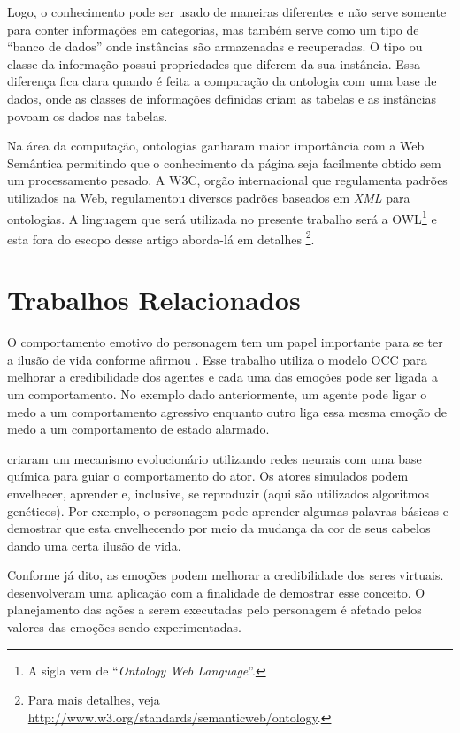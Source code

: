 Logo, o conhecimento pode ser usado de maneiras diferentes e não serve somente
para conter informações em categorias, mas também serve como um tipo de
``banco de dados'' onde instâncias são armazenadas e recuperadas.  O tipo ou
classe da informação possui propriedades que diferem da sua instância. Essa
diferença fica clara quando é feita a comparação da ontologia com uma base de
dados, onde as classes de informações definidas criam as tabelas e as
instâncias povoam os dados nas tabelas.

Na área da computação, ontologias ganharam maior importância com a Web
Semântica permitindo que o conhecimento da página seja facilmente obtido sem
um processamento pesado.  A W3C, orgão internacional que regulamenta padrões
utilizados na Web, regulamentou diversos padrões baseados em \emph{XML} para
ontologias.  A linguagem que será utilizada no presente trabalho será a
OWL\footnote{A sigla vem de ``\emph{Ontology Web Language}''.} e esta fora do
escopo desse artigo aborda-lá em detalhes \footnote{Para mais detalhes, veja
\url{http://www.w3.org/standards/semanticweb/ontology}.}.

\section{Trabalhos Relacionados}

O comportamento emotivo do personagem tem um papel importante para se ter a
ilusão de vida conforme afirmou \citet{bates1994role}. Esse trabalho utiliza o
modelo OCC para melhorar a credibilidade dos agentes e cada uma das emoções
pode ser ligada a um comportamento. No exemplo dado anteriormente, um agente
pode ligar o medo a um comportamento agressivo enquanto outro liga essa mesma
emoção de medo a um comportamento de estado alarmado.

\citet{GraCli98} criaram um mecanismo evolucionário utilizando redes neurais
com uma base química para guiar o comportamento do ator. Os atores simulados
podem envelhecer, aprender e, inclusive, se reproduzir (aqui são utilizados
algoritmos genéticos).  Por exemplo, o personagem pode aprender algumas
palavras básicas e demostrar que esta envelhecendo por meio da mudança da cor
de seus cabelos dando uma certa ilusão de vida.

Conforme já dito, as emoções podem melhorar a credibilidade dos seres
virtuais.  \citet{zhang2009emotional} desenvolveram uma aplicação com a
finalidade de demostrar esse conceito. O planejamento das ações a serem
executadas pelo personagem é afetado pelos valores das emoções sendo
experimentadas.

